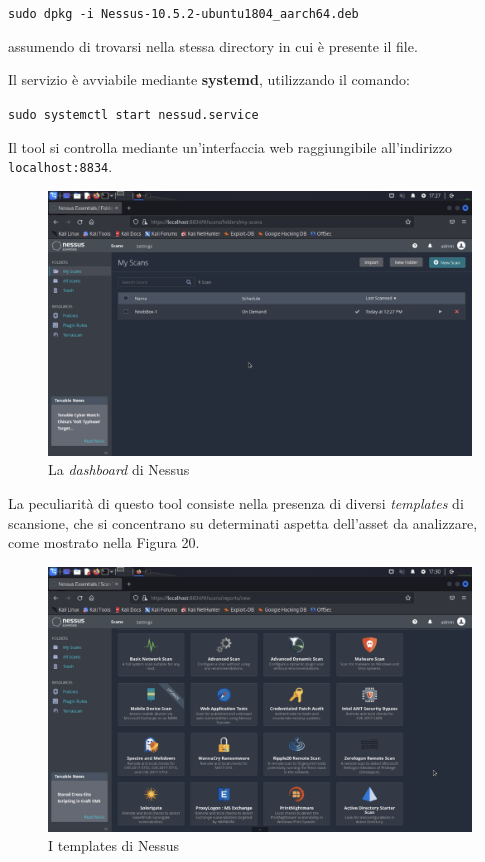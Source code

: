 \documentclass[a4paper, 12pt, oneside]{article}
\begin{document}
\begin{center}
    \texttt{sudo dpkg -i Nessus-10.5.2-ubuntu1804\_aarch64.deb}
\end{center}

assumendo di trovarsi nella stessa directory in cui è presente il file.

Il servizio è avviabile mediante \textbf{systemd}, utilizzando il comando:

\begin{center}
    \texttt{sudo systemctl start nessud.service}
\end{center}

Il tool si controlla mediante un'interfaccia web raggiungibile all'indirizzo \texttt{localhost:8834}.

\begin{figure}[h!]
    \centering
    \includegraphics[width=\textwidth]{img/nessus-dashboard.png}
    \caption{La \textit{dashboard} di Nessus}
\end{figure}

La peculiarità di questo tool consiste nella presenza di diversi \textit{templates} di scansione, che si concentrano su determinati aspetta dell'asset da analizzare, come mostrato nella Figura 20.

\begin{figure}[h!]
    \centering
    \includegraphics[width=\textwidth]{img/nessus-templates.png}
    \caption{I templates di Nessus}
\end{figure}
\end{document}
